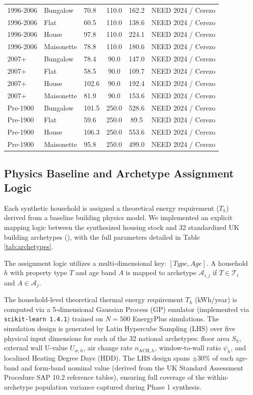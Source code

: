 \documentclass[11pt, a4paper, twocolumn, numbers]{elsarticle}
\begin{document}
\begin{table}[t]
\begin{tabular}{lllccl}
1996-2006 & Bungalow & 70.8 & 110.0 & 162.2 & NEED 2024 / Cerezo \\
1996-2006 & Flat & 60.5 & 110.0 & 138.6 & NEED 2024 / Cerezo \\
1996-2006 & House & 97.8 & 110.0 & 224.1 & NEED 2024 / Cerezo \\
1996-2006 & Maisonette & 78.8 & 110.0 & 180.6 & NEED 2024 / Cerezo \\
2007+ & Bungalow & 78.4 & 90.0 & 147.0 & NEED 2024 / Cerezo \\
2007+ & Flat & 58.5 & 90.0 & 109.7 & NEED 2024 / Cerezo \\
2007+ & House & 102.6 & 90.0 & 192.4 & NEED 2024 / Cerezo \\
2007+ & Maisonette & 81.9 & 90.0 & 153.6 & NEED 2024 / Cerezo \\
Pre-1900 & Bungalow & 101.5 & 250.0 & 528.6 & NEED 2024 / Cerezo \\
Pre-1900 & Flat & 59.6 & 250.0 & 89.5 & NEED 2024 / Cerezo \\
Pre-1900 & House & 106.3 & 250.0 & 553.6 & NEED 2024 / Cerezo \\
Pre-1900 & Maisonette & 95.8 & 250.0 & 499.0 & NEED 2024 / Cerezo \\
\bottomrule
\end{tabular}
\end{table}

\subsection{Physics Baseline and Archetype Assignment
Logic}\label{physics-baseline-and-archetype-assignment-logic}

Each synthetic household is assigned a theoretical energy requirement
(\(T_h\)) derived from a baseline building physics model. We implemented
an explicit mapping logic between the synthesized housing stock and 32
standardized UK building archetypes (\cite{Cerezo2017}), with the full parameters 
detailed in Table \ref{tab:archetypes}.

The assignment logic utilizes a multi-dimensional key:
\([Type, Age]\). A household \(h\) with property type
\(T\) and age band \(A\) is mapped to archetype \(\mathcal{A}_{i,j}\) if
\(T \in \mathcal{T}_i\) and \(A \in \mathcal{A}_j\).

The household-level theoretical thermal energy requirement \(T_h\) (kWh/year) is computed
via a 5-dimensional Gaussian Process (GP) emulator (implemented via \texttt{scikit-learn 1.4.1}) trained on \(N=500\) EnergyPlus simulations.
The simulation design is generated by Latin Hypercube Sampling (LHS) over five
physical input dimensions for each of the 32 national archetypes:
floor area \(S_h\), external wall U-value \(U_{w,h}\), air change rate \(n_{\mathrm{ACH},h}\),
window-to-wall ratio \(\psi_h\), and localized Heating Degree Days (HDD). The LHS design spans \(\pm 30\%\) of each age-band
and form-band nominal value (derived from the UK Standard Assessment Procedure SAP 10.2 reference tables), ensuring full coverage of the within-archetype population
variance captured during Phase 1 synthesis. 
\end{document}
